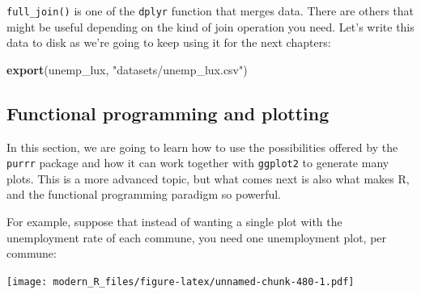 \documentclass[]{gitbook}
\newenvironment{Shaded}{\begin{snugshade}}{\end{snugshade}}
\newcommand{\DataTypeTok}[1]{\textcolor[rgb]{0.13,0.29,0.53}{#1}}
\newcommand{\KeywordTok}[1]{\textcolor[rgb]{0.13,0.29,0.53}{\textbf{#1}}}
\newcommand{\NormalTok}[1]{#1}
\newcommand{\OperatorTok}[1]{\textcolor[rgb]{0.81,0.36,0.00}{\textbf{#1}}}
\newcommand{\StringTok}[1]{\textcolor[rgb]{0.31,0.60,0.02}{#1}}
\theoremstyle{definition}
\theoremstyle{definition}
\theoremstyle{definition}
\theoremstyle{remark}
\begin{document}
\texttt{full\_join()} is one of the \texttt{dplyr} function that merges
data. There are others that might be useful depending on the kind of
join operation you need. Let's write this data to disk as we're going to
keep using it for the next chapters:

\begin{Shaded}
\begin{Highlighting}[]
\KeywordTok{export}\NormalTok{(unemp_lux, }\StringTok{"datasets/unemp_lux.csv"}\NormalTok{)}
\end{Highlighting}
\end{Shaded}

\hypertarget{functional-programming-and-plotting}{%
\subsection{Functional programming and
plotting}\label{functional-programming-and-plotting}}

In this section, we are going to learn how to use the possibilities
offered by the \texttt{purrr} package and how it can work together with
\texttt{ggplot2} to generate many plots. This is a more advanced topic,
but what comes next is also what makes R, and the functional programming
paradigm so powerful.

For example, suppose that instead of wanting a single plot with the
unemployment rate of each commune, you need one unemployment plot, per
commune:

\begin{Shaded}
\end{Shaded}

\texttt{[image: modern\_R\_files/figure-latex/unnamed-chunk-480-1.pdf]}
\end{document}
